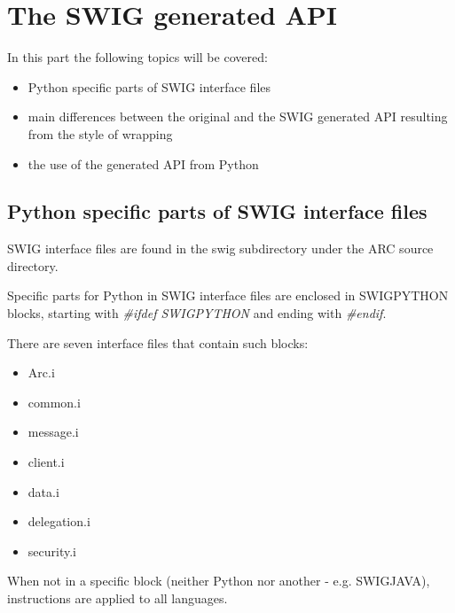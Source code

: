 \documentclass{article}
\begin{document}
\section{The SWIG generated API}

In this part the following topics will be covered: 

\begin{itemize}

  \item{Python specific parts of SWIG interface files}

  \item{main differences between the original and the SWIG generated API resulting 
    from the style of wrapping}

  \item{the use of the generated API from Python}

\end{itemize}

\subsection{Python specific parts of SWIG interface files}

SWIG interface files are found in the swig subdirectory under the ARC source directory.

Specific parts for Python in SWIG interface files are enclosed in SWIGPYTHON blocks, 
starting with \textit{\#ifdef SWIGPYTHON} and ending with \textit{\#endif}.

There are seven interface files that contain such blocks:

\begin{itemize}
  \item{Arc.i}

  \item{common.i}

  \item{message.i}

  \item{client.i}

  \item{data.i}

  \item{delegation.i}

  \item{security.i}
\end{itemize}

When not in a specific block (neither Python nor another - e.g. SWIGJAVA), instructions
are applied to all languages.
\end{document}
